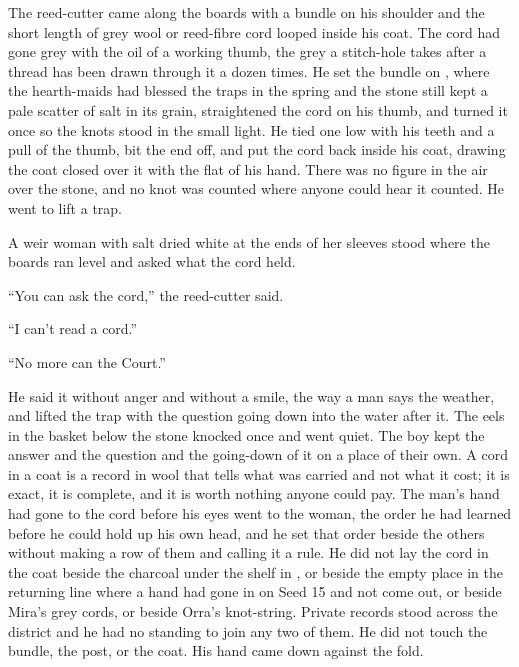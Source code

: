 The reed-cutter came along the boards with a bundle on his shoulder and the short length of grey wool or reed-fibre cord looped inside his coat. The cord had gone grey with the oil of a working thumb, the grey a stitch-hole takes after a thread has been drawn through it a dozen times. He set the bundle on , where the hearth-maids had blessed the traps in the spring and the stone still kept a pale scatter of salt in its grain, straightened the cord on his thumb, and turned it once so the knots stood in the small light. He tied one low with his teeth and a pull of the thumb, bit the end off, and put the cord back inside his coat, drawing the coat closed over it with the flat of his hand. There was no figure in the air over the stone, and no knot was counted where anyone could hear it counted. He went to lift a trap.

A weir woman with salt dried white at the ends of her sleeves stood where the boards ran level and asked what the cord held.

“You can ask the cord,” the reed-cutter said.

“I can't read a cord.”

“No more can the Court.”

He said it without anger and without a smile, the way a man says the weather, and lifted the trap with the question going down into the water after it. The eels in the basket below the stone knocked once and went quiet. The boy kept the answer and the question and the going-down of it on a place of their own. A cord in a coat is a record in wool that tells what was carried and not what it cost; it is exact, it is complete, and it is worth nothing anyone could pay. The man's hand had gone to the cord before his eyes went to the woman, the order he had learned before he could hold up his own head, and he set that order beside the others without making a row of them and calling it a rule. He did not lay the cord in the coat beside the charcoal under the shelf in , or beside the empty place in the returning line where a hand had gone in on Seed 15 and not come out, or beside Mira's grey cords, or beside Orra's knot-string. Private records stood across the district and he had no standing to join any two of them. He did not touch the bundle, the post, or the coat. His hand came down against the fold.

\scenebreak


